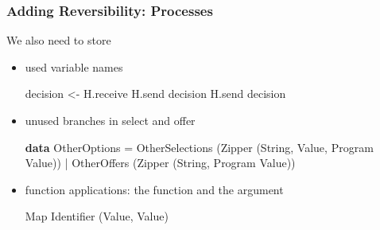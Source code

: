 \documentclass[12pt]{beamer}
\newenvironment{Shaded}{}{}
\newcommand{\KeywordTok}[1]{\textcolor[rgb]{0.00,0.44,0.13}{\textbf{#1}}}
\newcommand{\DataTypeTok}[1]{\textcolor[rgb]{0.56,0.13,0.00}{#1}}
\newcommand{\OtherTok}[1]{\textcolor[rgb]{0.00,0.44,0.13}{#1}}
\newcommand{\FunctionTok}[1]{\textcolor[rgb]{0.02,0.16,0.49}{#1}}
\newcommand{\NormalTok}[1]{#1}
\begin{document}
\begin{frame}[fragile]
\frametitle{Adding Reversibility: Processes}

We also need to store

\begin{itemize}
    \item used variable names \newline

\begin{Shaded}
\begin{Highlighting}[]
\NormalTok{decision }\OtherTok{<-} \NormalTok{H.receive }
\NormalTok{H.send decision}
\NormalTok{H.send decision}
\end{Highlighting}
\end{Shaded}

    \item unused branches in select and offer \newline


\begin{Shaded}
\begin{Highlighting}[]
\KeywordTok{data} \DataTypeTok{OtherOptions}  
    \FunctionTok{=} \DataTypeTok{OtherSelections} \NormalTok{(}\DataTypeTok{Zipper} \NormalTok{(}\DataTypeTok{String}\NormalTok{, }\DataTypeTok{Value}\NormalTok{, }\DataTypeTok{Program} \DataTypeTok{Value}\NormalTok{))}
    \FunctionTok{|} \DataTypeTok{OtherOffers} \NormalTok{(}\DataTypeTok{Zipper} \NormalTok{(}\DataTypeTok{String}\NormalTok{, }\DataTypeTok{Program} \DataTypeTok{Value}\NormalTok{))}
\end{Highlighting}
\end{Shaded}

    \item function applications: the function and the argument \newline
\begin{Shaded}
\begin{Highlighting}[]
\DataTypeTok{Map} \DataTypeTok{Identifier} \NormalTok{(}\DataTypeTok{Value}\NormalTok{, }\DataTypeTok{Value}\NormalTok{)}
\end{Highlighting}
\end{Shaded}
\end{itemize}

\end{frame}
\end{document}
